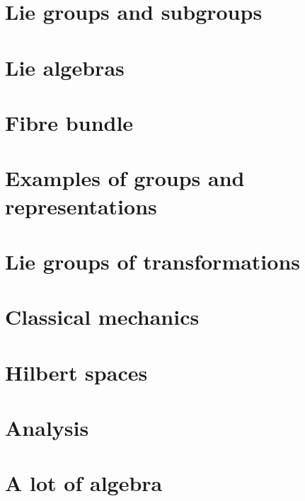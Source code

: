 \chapter{Lie groups and subgroups}


\chapter{Lie algebras}
  
 





\chapter{Fibre bundle}



\chapter{Examples of groups and representations}        \label{ChapThoComsGroupes}



\chapter{Lie groups of transformations}


\chapter{Classical mechanics}



\chapter{Hilbert spaces}



\chapter{Analysis}









\chapter{A lot of algebra}




